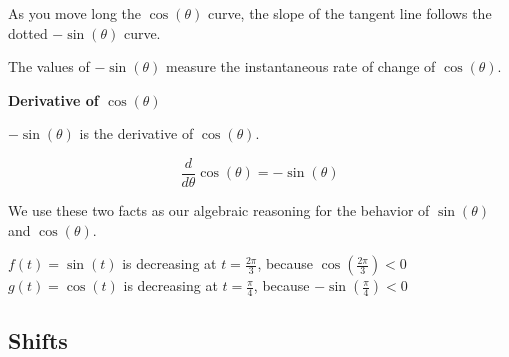 \documentclass{ximera}
\begin{document}
As you move long the $\cos(\theta)$ curve, the slope of the tangent line follows the dotted $-\sin(\theta)$ curve.



\begin{center}
\end{center}



The values of $-\sin(\theta)$ measure the instantaneous rate of change of $\cos(\theta)$.



\begin{theorem}  \textbf{\textcolor{green!50!black}{Derivative of $\cos(\theta)$}}

\begin{center}
$-\sin(\theta)$ is the derivative of $\cos(\theta)$. 
\end{center}


\[
\frac{d}{d\theta} \cos(\theta) = -\sin(\theta)
\]


\end{theorem}







We use these two facts as our algebraic reasoning for the behavior of $\sin(\theta)$ and $\cos(\theta)$.




\begin{example}



$f(t) = \sin(t)$ is decreasing at $t=\frac{2\pi}{3}$, because $\cos\left( \frac{2\pi}{3} \right) < 0$ \\


$g(t) = \cos(t)$ is decreasing at $t=\frac{\pi}{4}$, because $-\sin\left( \frac{\pi}{4} \right) < 0$

\end{example}

















\subsection{Shifts}
\end{document}
